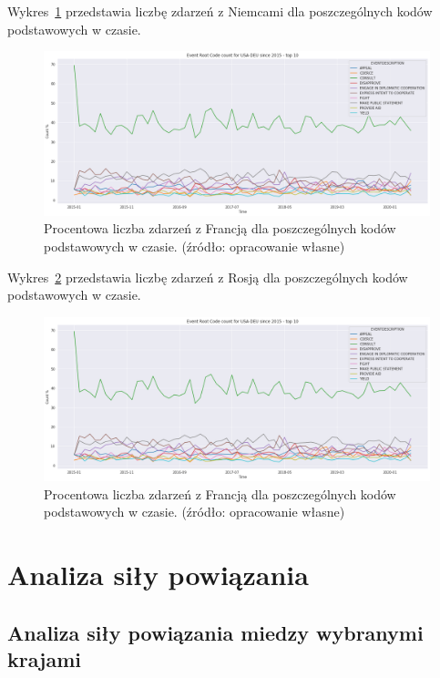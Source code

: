 \documentclass[11pt]{report}
\begin{document}
    Wykres~\ref{fig:USADEUERC} przedstawia liczbę zdarzeń z Niemcami dla poszczególnych kodów podstawowych w czasie.
    \begin{figure}[!htp]
        \centering
        \includegraphics[width=\linewidth]{fig/USA/USADEUERCperc.png}
        \caption{Procentowa liczba zdarzeń z Francją dla poszczególnych kodów podstawowych w czasie. (źródło: opracowanie własne)}
        \label{fig:USADEUERC}
    \end{figure}

    Wykres~\ref{fig:USARUSERC} przedstawia liczbę zdarzeń z Rosją dla poszczególnych kodów podstawowych w czasie.
    \begin{figure}[!htp]
        \centering
        \includegraphics[width=\linewidth]{fig/USA/USADEUERCperc.png}
        \caption{Procentowa liczba zdarzeń z Francją dla poszczególnych kodów podstawowych w czasie. (źródło: opracowanie własne)}
        \label{fig:USARUSERC}
    \end{figure}


    \section{Analiza siły powiązania}\label{sec:analiza-siły-powiązania}

    \subsection{Analiza siły powiązania miedzy wybranymi krajami}
\end{document}
